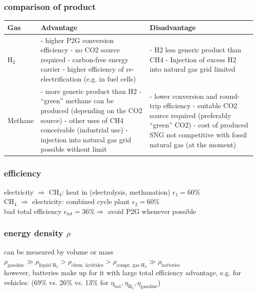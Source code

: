 \documentclass[a4paper,10pt,landscape]{scrartcl}
\begin{document}
\begin{multicols*}{3}
\subsubsection{comparison of product}
\tiny
\begin{tabular}{|p{.75cm}|p{3.8cm}|p{3.8cm}|}
\hline
\textbf{Gas} & \textbf{Advantage} & \textbf{Disadvantage} \\ \hline
$\mathrm{H_2}$ & - higher P2G conversion efficiency \newline
- no CO2 source required \newline
- carbon-free energy carrier \newline
- higher efficiency of re-electrification (e.g. in fuel cells) & 
- H2 less generic product than CH4 \newline
- Injection of excess H2 into natural gas grid limited \\ \hline
Methane & - more generic product than H2 \newline
- “green” methane can be produced (depending on the CO2 source)
- other uses of CH4 conceivable (industrial use) \newline
- injection into natural gas grid possible without limit & 
- lower conversion and round-trip efficiency \newline
- suitable CO2 source required (preferably “green” CO2) \newline
- cost of produced SNG not competitive with fossil natural gas (at the moment) \\ \hline
\end{tabular}

\small

\subsubsection{efficiency}
electricity $\Rightarrow$ $\mathrm{CH}_4$: heat in (electrolysis,  methanation) $\epsilon_1=60\%$ \\
$\mathrm{CH}_4$ $\Rightarrow$ electricity: combined cycle plant $\epsilon_2=60\%$ \\
bad total efficiency $\epsilon_{tot}=36\%\Rightarrow$ avoid P2G whenever possible

\subsubsection{energy density $\rho$}
can be measured by volume or mass \\
$\rho_{\text{gasoline}} \gg \rho_{\text{liquid $\mathrm{H}_2$}} > \rho_{\text{chem. hydrides}} > \rho_{\text{compr. gas $\mathrm{H}_2$}} \gg \rho_\text{batteries}$ \\
however, batteries make up for it with large total efficiency advantage, e.g. for vehicles: (69\% vs. 26\% vs. 13\% for $\eta_\text{bat},\eta_{\mathrm{H}_2},\eta_{\text{gasoline}}$)


\end{multicols*}
\end{document}
